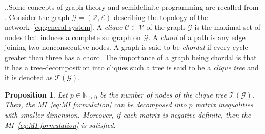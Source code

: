 \documentclass[10pt,twocolumn,twoside]{IEEEtran}
\newcounter{para}
\newcommand\mypara{\par \thesection.\refstepcounter{para}\thepara.\space}
\theoremstyle{plain}
\newtheorem{proposition}{Proposition}
\theoremstyle{definition}
\theoremstyle{remark}
\begin{document}
\mypara Some concepts of graph theory and semidefinite programming are recalled from \cite{PakazadHanssonAndersenEtAl2015,VandenbergheAndersen2015,BlairPeyton1993}. Consider the graph $\mathscr{G}=(\mathscr{V},\mathscr{E})$ describing the topology of the network~\eqref{eq:general system}. A \emph{clique} $\mathscr{C}\subset\mathscr{V}$ of the graph $\mathscr{G}$ is the maximal set of nodes that induces a complete subgraph on $\mathscr{G}$. A \emph{chord} of a path is any edge joining two nonconsecutive nodes. A graph is said to be \emph{chordal} if every cycle greater than three has a chord. The importance of a graph being chordal is that it has a tree-decomposition into cliques  \cite[Proposition~12.3.11]{Diestel2005} such a tree is said to be a \emph{clique tree} and it is denoted as $\mathscr{T}(\mathscr{G})$.

\begin{proposition}\label{prop:clique tree decomposition}
	Let $p\in\mathbb{N}_{>0}$ be the number of nodes of the clique tree $\mathscr{T}(\mathscr{G})$. Then, the MI~\eqref{eq:MI formulation} can be decomposed into $p$ matrix inequalities with smaller dimension. Moreover, if each matrix is negative definite, then the MI~\eqref{eq:MI formulation} is satisfied.
\end{proposition}
\end{document}
